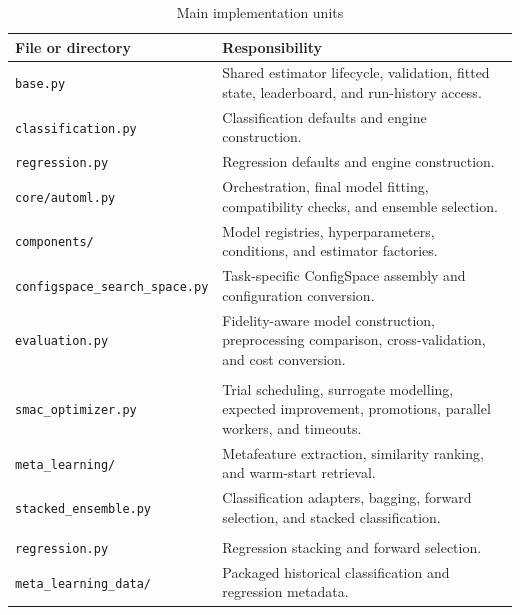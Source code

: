 \documentclass[12pt,a4paper,oneside]{report}
\newcommand{\modulepath}[1]{\texttt{\footnotesize #1}}
\begin{document}
\begin{table}[H]
\centering
\caption{Main implementation units}
\label{tab:implementation-units}

\small
\renewcommand{\arraystretch}{1.18}
\begin{tabularx}{\textwidth}
{
>{\raggedright\arraybackslash}p{}
X
}
\toprule
\textbf{File or directory} & \textbf{Responsibility} \\
\midrule

\modulepath{base.py} &
Shared estimator lifecycle, validation, fitted state, leaderboard, and
run-history access. \\

\modulepath{classification.py} &
Classification defaults and engine construction. \\

\modulepath{regression.py} &
Regression defaults and engine construction. \\

\modulepath{core/automl.py} &
Orchestration, final model fitting, compatibility checks, and ensemble
selection. \\

\modulepath{components/} &
Model registries, hyperparameters, conditions, and estimator factories. \\

\modulepath{configspace\_search\_space.py} &
Task-specific ConfigSpace assembly and configuration conversion. \\

\modulepath{evaluation.py} &
Fidelity-aware model construction, preprocessing comparison, cross-validation,
and cost conversion. \\

\begin{tabular}[t]{@{}l@{}}
\modulepath{optimization/} \\
\modulepath{smac\_optimizer.py}
\end{tabular}
&
Trial scheduling, surrogate modelling, expected improvement, promotions,
parallel workers, and timeouts. \\

\modulepath{meta\_learning/} &
Metafeature extraction, similarity ranking, and warm-start retrieval. \\

\modulepath{stacked\_ensemble.py} &
Classification adapters, bagging, forward selection, and stacked
classification. \\

\begin{tabular}[t]{@{}l@{}}
\modulepath{stacked\_ensemble\_} \\
\modulepath{regression.py}
\end{tabular}
&
Regression stacking and forward selection. \\

\modulepath{meta\_learning\_data/} &
Packaged historical classification and regression metadata. \\

\bottomrule
\end{tabularx}
\end{table}
\end{document}
